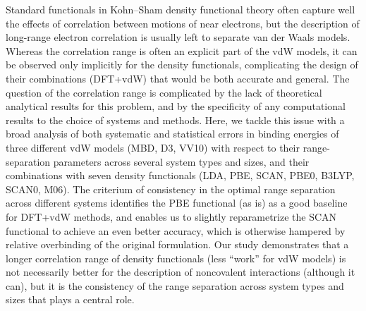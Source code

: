 Standard functionals in Kohn--Sham density functional theory often capture well the effects of correlation between motions of near electrons, but the description of long-range electron correlation is usually left to separate van der Waals models.
Whereas the correlation range is often an explicit part of the vdW models, it can be observed only implicitly for the density functionals, complicating the design of their combinations (DFT+vdW) that would be both accurate and general.
The question of the correlation range is complicated by the lack of theoretical analytical results for this problem, and by the specificity of any computational results to the choice of systems and methods.
Here, we tackle this issue with a broad analysis of both systematic and statistical errors in binding energies of three different vdW models (MBD, D3, VV10) with respect to their range-separation parameters across several system types and sizes, and their combinations with seven density functionals (LDA, PBE, SCAN, PBE0, B3LYP, SCAN0, M06).
The criterium of consistency in the optimal range separation across different systems identifies the PBE functional (as is) as a good baseline for DFT+vdW methods, and enables us to slightly reparametrize the SCAN functional to achieve an even better accuracy, which is otherwise hampered by relative overbinding of the original formulation.
Our study demonstrates that a longer correlation range of density functionals (less ``work'' for vdW models) is not necessarily better for the description of noncovalent interactions (although it can), but it is the consistency of the range separation across system types and sizes that plays a central role.